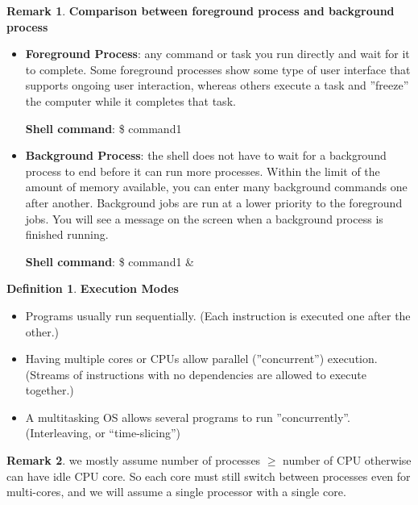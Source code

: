 \documentclass[11pt,a4paper]{article}
\theoremstyle{definition}
\newtheorem*{remark}{Remark}
\newtheorem{definition}{Definition}[section]
\newenvironment{myitemize}
{ \begin{itemize}
    \setlength{\itemsep}{5pt}
    \setlength{\parskip}{0pt}
    \setlength{\parsep}{0pt}     }
{ \end{itemize}                  }
\begin{document}
\begin{remark}{\textbf{Comparison between foreground process and background process}}
	\begin{myitemize}
		\item \textbf{Foreground Process}: any command or task you run directly and wait for it to complete. Some foreground processes show some type of user interface that supports ongoing user interaction, whereas others execute a task and ''freeze'' the computer while it completes that task.
		
		\textbf{Shell command}: \textsf{\$ command1}
		\item \textbf{Background Process}: the shell does not have to wait for a background process to end before it can run more processes. Within the limit of the amount of memory available, you can enter many background commands one after another. Background jobs are run at a lower priority to the foreground jobs. You will see a message on the screen when a background process is finished running.
		
		\textbf{Shell command}: \textsf{\$ command1 \&}
	\end{myitemize}
\end{remark}

\begin{definition}{\textbf{Execution Modes}}
	\begin{myitemize}
		\item Programs usually run sequentially. (Each instruction is executed one after the other.)
		\item Having multiple cores or CPUs allow parallel (''concurrent'') execution. (Streams of instructions with no dependencies are allowed to execute together.)
		\item A multitasking OS allows several programs to run ''concurrently''. (Interleaving, or “time-slicing”)
	\end{myitemize}
\end{definition}

\begin{remark}
	we mostly assume number of processes $\geq$ number of CPU otherwise can have idle CPU core. So each core must still switch between processes even for multi-cores, and we will assume a single processor with a single core.
\end{remark}
\end{document}
